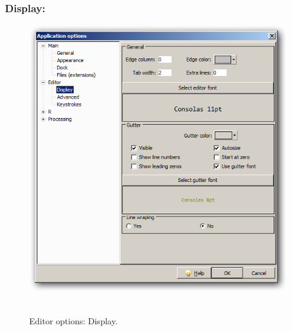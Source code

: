 \hypertarget{working_editor_display}{}
\subsubsection{Display:}

\begin{figure}[h!]
  \includegraphics[scale=0.50]{./res/app_editor_display.png}~~
  \caption{Editor options: Display.}
  \label{fig:editor_display}
\end{figure}

